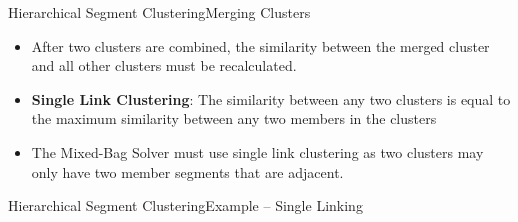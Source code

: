 \documentclass[handout,10pt]{beamer}  %
\begin{document}
\begin{frame}{Hierarchical Segment Clustering}{Merging Clusters}
  \begin{itemize}
    \item After two clusters are combined, the similarity between the merged cluster and all other clusters must be recalculated.
    \vfill
    \item \textbf{Single Link Clustering}: The similarity between any two clusters is equal to the maximum similarity between any two members in the clusters~\cite{tanIntroToDataMining}
    \vspace{1em}
    \item The Mixed-Bag Solver must use single link clustering as two clusters may only have two member segments that are adjacent.
  \end{itemize}
\end{frame}




\begin{frame}{Hierarchical Segment Clustering}{Example -- Single Linking}
  \begin{center}
    \vfill    
  \end{center}
\end{frame}
\end{document}
